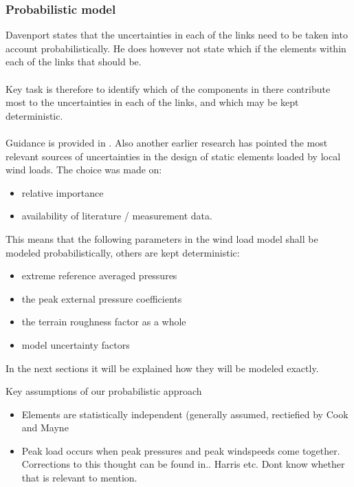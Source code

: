 \subsubsection{Probabilistic model}
Davenport states that the uncertainties in each of the links need to be taken into account probabilistically. He does however not state which if the elements within each of the links that should be. \\
\\
Key task is therefore to identify which of the components in there contribute most to the uncertainties in each of the links, and which may be kept deterministic. \\
\\
Guidance is provided in \cite{Kasperski_PAPER}. Also another earlier research \cite{meinen} has pointed the most relevant sources of uncertainties in the design of static elements loaded by local wind loads. The choice was made on:
\begin{itemize}
\item relative importance
\item availability of literature / measurement data. 
\end{itemize}
This means that the following parameters in the wind load model shall be modeled probabilistically, others are kept deterministic:
\begin{itemize}
\item extreme reference averaged pressures
\item the peak external pressure coefficients
\item the terrain roughness factor as a whole 
\item model uncertainty factors 
\end{itemize}
In the next sections it will be explained how they will be modeled exactly. 

\begin{framed}
Key assumptions of our probabilistic approach 
\begin{itemize}
\item Elements are statistically independent (generally assumed, rectiefied by Cook and Mayne
\item Peak load occurs when peak pressures and peak windspeeds come together. Corrections to this thought can be found in.. Harris etc. Dont know whether that is relevant to mention. 
\end{itemize}
\end{framed}


